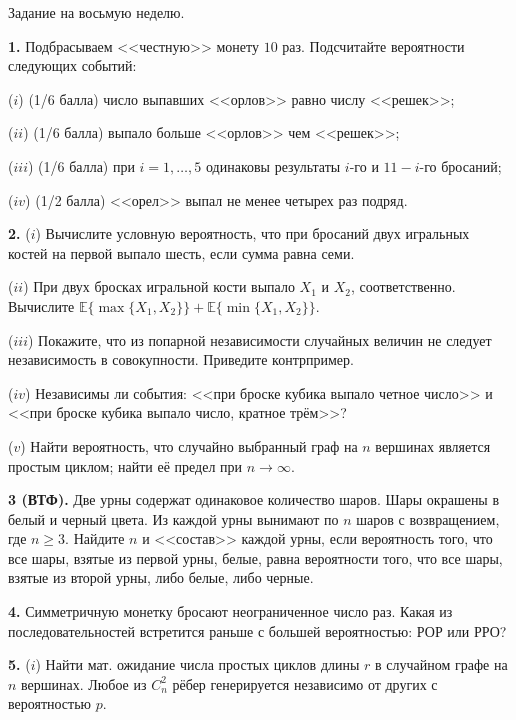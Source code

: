\documentclass[12pt,a5paper,fleqn]{article}
\begin{document}
\begin{center}
{ \Large Задание на восьмую неделю.}

\end{center}

{\bf 1.} Подбрасываем <<честную>> монету $10$ раз. Подсчитайте вероятности следующих событий:

($i$) (1/6 балла)  число выпавших <<орлов>>  равно числу <<решек>>;

($ii$) (1/6 балла)  выпало больше <<орлов>>  чем <<решек>>;

($iii$) (1/6 балла) при $i=1,\dots,5$ одинаковы результаты $i$-го и $11-i$-го бросаний;

($iv$) (1/2 балла) <<орел>> выпал не менее четырех раз подряд. 

\smallskip

{\bf 2.} ($i$) Вычислите условную вероятность, что при бросаний двух игральных костей на первой выпало шесть, если сумма равна семи.

($ii$) При двух бросках игральной кости выпало $X_1$ и $X_2$, соответственно. Вычислите $\mathbb{E}\{\max\{X_1,X_2\}\} + \mathbb{E}\{\min\{X_1,X_2\}\}$.

($iii$) Покажите, что из попарной независимости случайных величин не следует независимость в совокупности. Приведите контрпример.

($iv$) Независимы ли события: <<при броске кубика выпало четное число>> и <<при броске кубика выпало число, кратное трём>>?

($v$) Найти вероятность, что случайно выбранный граф на $n$ вершинах является простым циклом; найти её предел при $n\rightarrow \infty$.

\smallskip

{\bf 3 (ВТФ).} Две урны содержат одинаковое количество шаров. Шары окрашены в белый и черный цвета. Из каждой урны вынимают по $n$ шаров с возвращением, где $n \geq 3$. Найдите $n$ и <<состав>> каждой урны, если вероятность того, что все шары, взятые из первой урны, белые, равна вероятности того, что все шары, взятые из второй урны, либо белые, либо черные.

\smallskip

{\bf 4.} Симметричную монетку бросают неограниченное число раз. Какая из последовательностей встретится раньше с большей вероятностью: РОР или РРО?

\smallskip

{\bf 5.} ($i$) Найти мат. ожидание числа простых циклов длины $r$ в случайном графе на $n$ вершинах. Любое из $C_n^2$ рёбер генерируется независимо от других с вероятностью $p$.
\end{document}
